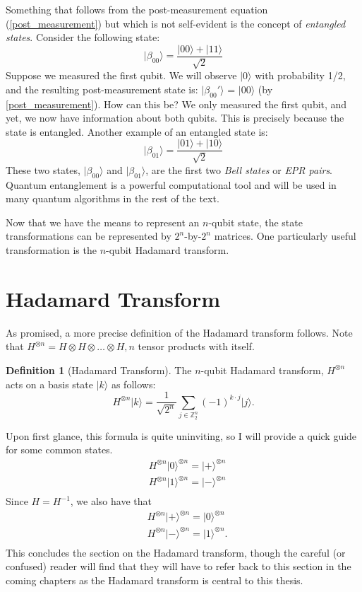 \documentclass[12pt,twoside]{reedthesis}
\theoremstyle{definition}
\newtheorem{definition}[theorem]{Definition}
\newcommand{\Z}{\mathbb{Z}}
\newcommand{\ketz}{\ensuremath{\lvert 0\rangle}\xspace}
\newcommand{\keto}{\ensuremath{\lvert 1\rangle}\xspace}
\newcommand{\ket}[1]{\ensuremath{\lvert #1\rangle}\xspace}
\newcommand{\Hplus}{\ensuremath{\lvert + \rangle}\xspace}
\newcommand{\Hminus}{\ensuremath{\lvert- \rangle}\xspace}
\begin{document}
Something that follows from the post-measurement equation (\ref{post_measurement}) but which is not self-evident is the concept of \textit{entangled states}. Consider the following state:
\begin{equation*}
\ket{\beta_{00}} = \frac{\ket{00} + \ket{11}}{\sqrt{2}}
\end{equation*}
Suppose we measured the first qubit. We will observe \ket{0} with probability 1/2, and the resulting post-measurement state is: \ket{\beta_{00}'} = \ket{00} (by \ref{post_measurement}). How can this be? We only measured the first qubit, and yet, we now have information about both qubits. This is precisely because the state is entangled. Another example of an entangled state is:
\begin{equation*}
\ket{\beta_{01}} = \frac{\ket{01} + \ket{10}}{\sqrt{2}}
\end{equation*}
These two states, \ket{\beta_{00}} and \ket{\beta_{01}}, are the first two \textit{Bell states} or \textit{EPR pairs}. Quantum entanglement is a powerful computational tool and will be used in many quantum algorithms in the rest of the text. 

Now that we have the means to represent an $n$-qubit state, the state transformations can be represented by $2^n$-by-$2^n$ matrices. One particularly useful transformation is the $n$-qubit Hadamard transform.

\section{Hadamard Transform}

As promised, a more precise definition of the Hadamard transform follows. Note that $H^{\otimes n} = H \otimes H \otimes \ldots \otimes H, n$ tensor products with itself. 

\begin{definition}[Hadamard Transform] The $n$-qubit Hadamard transform, $H^{\otimes n}$ acts on a basis state $\ket{k}$ as follows:
\begin{equation*}
H^{\otimes n} \ket{k} = \frac{1}{\sqrt{2^n}} \sum_{j \in \Z_2^n} (-1)^{k \cdot j} \ket{j}.
\end{equation*}
\end{definition}
Upon first glance, this formula is quite uninviting, so I will provide a quick guide for some common states. 
\begin{align*}
& H^{\otimes n} \ketz^{\otimes n} = \Hplus^{\otimes n} \\
& H^{\otimes n} \keto^{\otimes n} = \Hminus^{\otimes n} \\
\end{align*}
Since $H = H^{-1}$, we also have that
\begin{align*}
& H^{\otimes n} \Hplus^{\otimes n} =  \ketz^{\otimes n} \\
& H^{\otimes n} \Hminus^{\otimes n} = \keto^{\otimes n}. \\
\end{align*}
This concludes the section on the Hadamard transform, though the careful (or confused) reader will find that they will have to refer back to this section in the coming chapters as the Hadamard transform is central to this thesis.
\end{document}
